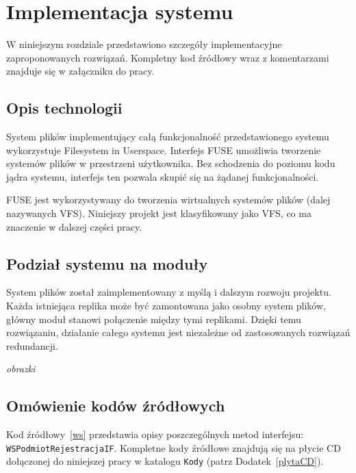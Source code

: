 \chapter{Implementacja systemu}
\thispagestyle{chapterBeginStyle}
W niniejszym rozdziale przedstawiono szczegóły implementacyjne zaproponowanych rozwiązań. Kompletny kod źródłowy wraz z komentarzami znajduje się w załączniku do pracy.

\section{Opis technologii}

System plików implementujący całą funkcjonalność przedstawionego systemu wykorzystuje Filesystem in Userspace. Interfejs FUSE umożliwia tworzenie systemów plików w przestrzeni użytkownika. Bez schodzenia do poziomu kodu jądra systemu, interfejs ten pozwala skupić się na żądanej funkcjonalności.

FUSE jest wykorzystywany do tworzenia wirtualnych systemów plików (dalej nazywanych VFS). Niniejszy projekt jest klasyfikowany jako VFS, co ma znaczenie w dalszej części pracy.

\section{Podział systemu na moduły}
System plików został zaimplementowany z myślą i dalszym rozwoju projektu. Każda istniejąca replika może być zamontowana jako osobny system plików, główny moduł stanowi połączenie między tymi replikami. Dzięki temu rozwiązaniu, działanie całego systemu jest niezależne od zastosowanych rozwiązań redundancji.

\textit{obrazki}

\section{Omówienie kodów źródłowych}

{\color{dgray}
Kod źródłowy~\ref{ws} przedstawia opisy poszczególnych metod interfejsu: \texttt{WSPodmiotRejestracjaIF}. Kompletne
kody źródłowe znajdują się na płycie CD dołączonej do niniejszej pracy w katalogu \texttt{Kody} (patrz Dodatek~\ref{plytaCD}).
}

